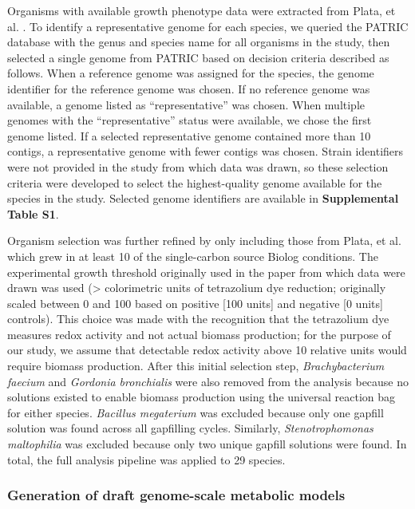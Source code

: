 \documentclass[11pt,twocolumn,notitlepage,openany,twoside]{book}
\begin{document}
\begin{refsection}
Organisms with available growth phenotype data were extracted from Plata, et al. \cite{Plata2015-bc}. To identify a representative genome for each species, we queried the PATRIC database \cite{Wattam2017-tk} with the genus and species name for all organisms in the study, then selected a single genome from PATRIC based on decision criteria described as follows. When a reference genome was assigned for the species, the genome identifier for the reference genome was chosen. If no reference genome was available, a genome listed as “representative” was chosen. When multiple genomes with the “representative” status were available, we chose the first genome listed. If a selected representative genome contained more than 10 contigs, a representative genome with fewer contigs was chosen. Strain identifiers were not provided in the study from which data was drawn, so these selection criteria were developed to select the highest-quality genome available for the species in the study. Selected genome identifiers are available in \textbf{Supplemental Table S1}.

Organism selection was further refined by only including those from Plata, et al. which grew in at least 10 of the single-carbon source Biolog conditions. The experimental growth threshold originally used in the paper from which data were drawn was used (\textgreater{} colorimetric units of tetrazolium dye reduction; originally scaled between 0 and 100 based on positive [100 units] and negative [0 units] controls). This choice was made with the recognition that the tetrazolium dye measures redox activity and not actual biomass production; for the purpose of our study, we assume that detectable redox activity above 10 relative units would require biomass production. After this initial selection step, \textit{Brachybacterium faecium} and \textit{Gordonia bronchialis} were also removed from the analysis because no solutions existed to enable biomass production using the universal reaction bag for either species. \textit{Bacillus megaterium} was excluded because only one gapfill solution was found across all gapfilling cycles. Similarly, \textit{Stenotrophomonas maltophilia} was excluded because only two unique gapfill solutions were found. In total, the full analysis pipeline was applied to 29 species.

\subsubsection{Generation of draft genome-scale metabolic models}


\end{refsection}
\end{document}
